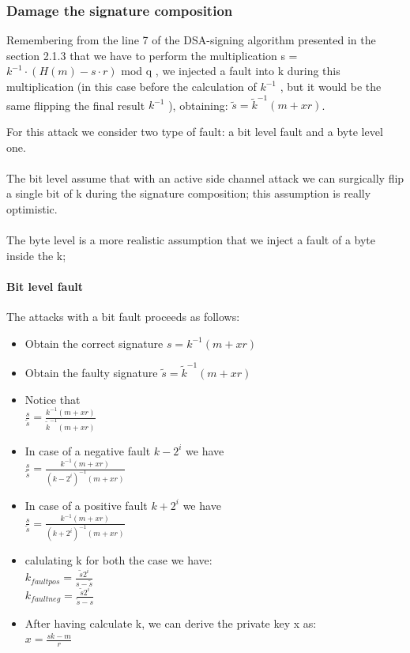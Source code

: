 \documentclass[11pt,english]{article}
\begin{document}
\subsubsection{Damage the signature composition}

Remembering from the line 7 of the DSA-signing algorithm presented in the section 2.1.3 that we have to perform the multiplication s  = $k^{-1} \cdot (H(m) - s \cdot r)$ mod q , we injected a fault into k during this multiplication (in this case before the calculation of $k^{-1}$ , but it would be the same flipping the final result $k^{-1}$ ), obtaining: $\tilde{s} = \tilde{k}^{-1}(m + xr)$.

For this attack we consider two type of fault: a bit level fault and a byte level one.\\\\ The bit level assume that with an active side channel attack we can surgically flip a single bit of k during the signature composition; this assumption is really optimistic.\\\\ The byte level is a more realistic assumption that we inject a fault of a byte inside the k; 

\paragraph{Bit level fault}

The attacks with a bit fault proceeds as follows: 
\begin{itemize}
\item Obtain the correct signature $s = k^{-1}(m + xr) $
\item Obtain the faulty signature $\tilde{s} = \tilde{k}^{-1}(m + xr)$
\item Notice that \\$\frac{s}{\tilde{s}}  = \frac{k^{-1}(m+xr)}{\tilde{k}^{-1}(m+xr)}$

\item In case of a negative fault $k-2^{i} $ we have\\ $\frac{s}{\tilde{s}} = \frac{k^{-1}(m+xr)}{(k-2^{i})^{-1}(m+xr)}$

\item In case of a positive fault $k+2^{i} $ we have \\$\frac{s}{\tilde{s}} = \frac{k^{-1}(m+xr)}{(k+2^{i})^{-1}(m+xr)}$

\item calulating k for both the case we have: \\$k_{faultpos} = \frac{\tilde{s}2^{i}}{s-\tilde{s}}$ \\
$k_{faultneg} = \frac{\tilde{s}2^{i}}{\tilde{s}-s}$ \\

\item After having calculate k, we can derive the private key x as:\\ $x = \frac{sk - m}{r}$


\end{itemize}
\end{document}
